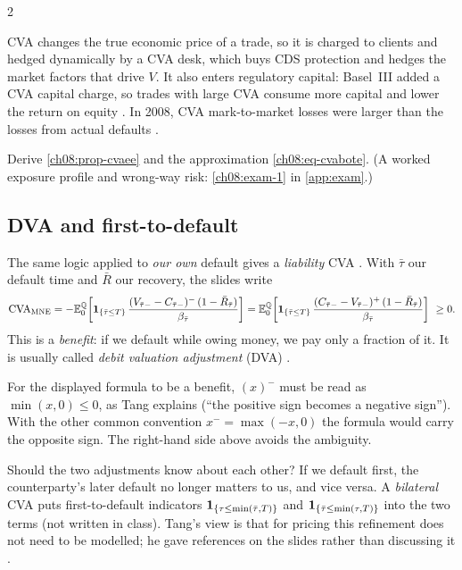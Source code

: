 \begin{paracol}{2}
\begin{finance}
CVA changes the true economic price of a trade, so it is charged to clients and hedged dynamically by a CVA
desk, which buys CDS protection and hedges the market factors that drive $V$. It also enters regulatory capital:
Basel~III added a CVA capital charge, so trades with large CVA consume more capital and lower the return on
equity . In 2008, CVA mark-to-market losses were larger than the losses from actual defaults
.
\end{finance}

\begin{exercise}\label{ch08:exam-1-short}
Derive \cref{ch08:prop-cvaee} and the approximation \eqref{ch08:eq-cvabote}. (A worked exposure profile and wrong-way risk: \cref{ch08:exam-1} in \cref{app:exam}.)
\end{exercise}

\subsection{DVA and first-to-default}
The same logic applied to \emph{our own} default gives a \emph{liability} CVA . With $\bar\tau$
our default time and $\bar R$ our recovery, the slides write
\[
  \mathrm{CVA}_{\mathrm{MNE}} = -\mathbb{E}_0^{\mathbb{Q}}\!\left[\mathbf{1}_{\{\bar\tau\le T\}}\,
      \frac{(V_{\bar\tau-}-C_{\bar\tau-})^-\,(1-\bar R_{\bar\tau})}{\beta_{\bar\tau}}\right]
  = \mathbb{E}_0^{\mathbb{Q}}\!\left[\mathbf{1}_{\{\bar\tau\le T\}}\,
      \frac{(C_{\bar\tau-}-V_{\bar\tau-})^+\,(1-\bar R_{\bar\tau})}{\beta_{\bar\tau}}\right]\ \ge 0 .
\]
This is a \emph{benefit}: if we default while owing money, we pay only a fraction of it. It is usually called
\emph{debit valuation adjustment} (DVA) .

\begin{coursenote}
For the displayed formula to be a benefit, $(x)^-$ must be read as $\min(x,0)\le0$, as Tang explains
(``the positive sign becomes a negative sign''). With the other common convention $x^-=\max(-x,0)$ the
formula would carry the opposite sign. The right-hand side above avoids the ambiguity.
\end{coursenote}

Should the two adjustments know about each other? If we default first, the counterparty's later default no longer
matters to us, and vice versa. A \emph{bilateral} CVA puts first-to-default indicators $\mathbf{1}_{\{\tau\le\min(\bar\tau,T)\}}$
and $\mathbf{1}_{\{\bar\tau\le\min(\tau,T)\}}$ into the two terms (not written in class). Tang's view is that for pricing
this refinement does not need to be modelled; he gave references on the slides rather than discussing it
.


\end{paracol}

